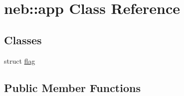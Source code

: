 \hypertarget{classneb_1_1app}{
\section{neb::app Class Reference}
\label{classneb_1_1app}
}
\subsection*{Classes}
\begin{DoxyCompactItemize}
\item 
struct \hyperlink{structneb_1_1app_1_1flag}{flag}
\end{DoxyCompactItemize}
\subsection*{Public Member Functions}
